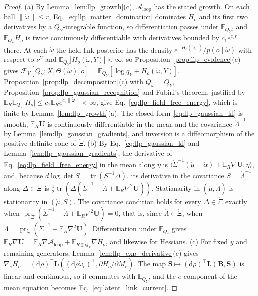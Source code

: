 \begin{proof}
(a) By Lemma~\ref{lem:llp_growth}(c), $\mathcal A_{\mathrm{loop}}$ has the stated growth. On each ball $\|\mathring\omega\|\leq r$, Eq.~\eqref{eq:llp_matter_domination} dominates $H_o$ and its first two derivatives by a $Q_Y$-integrable function, so differentiation passes under $\mathbb E_{Q_Y}$, and $\mathbb E_{Q_Y}H_o$ is twice continuously differentiable with derivatives bounded by $c_1e^{c_2r}$ there. At each $\mathring\omega$ the held-link posterior has the density $e^{-H_o(\mathring\omega,\cdot)}/p(o\mid\mathring\omega)$ with respect to $\nu^Y$ and $\mathbb E_{Q_Y}|H_o(\mathring\omega,Y)|<\infty$, so Proposition~\ref{prop:llp_evidence}(c) gives $\mathcal F_V[Q_Y;X,\Theta(\mathring\omega),o]=\mathbb E_{Q_Y}[\log q_Y+H_o(\mathring\omega,Y)]$. Proposition~\ref{prop:llp_decomposition}(c) with $Q_{\mathring\omega}=Q_Y$, Proposition~\ref{prop:llp_gaussian_recognition} and Fubini's theorem, justified by $\mathbb E_R\mathbb E_{Q_Y}|H_o|\leq c_1\mathbb E_Re^{c_2\|\mathring\omega\|}<\infty$, give Eq.~\eqref{eq:llp_field_free_energy}, which is finite by Lemma~\ref{lem:llp_growth}(a). The closed form~\eqref{eq:llp_gaussian_kl} is smooth, $\mathbb E_R\mathbf U$ is continuously differentiable in the mean and the covariance $\mathring\Lambda^{-1}$ by Lemma~\ref{lem:llp_gaussian_gradients}, and inversion is a diffeomorphism of the positive-definite cone of $\mathring\Xi$.
(b) By Eq.~\eqref{eq:llp_gaussian_kl} and Lemma~\ref{lem:llp_gaussian_gradients}, the derivative of Eq.~\eqref{eq:llp_field_free_energy} in the mean along $\eta$ is $\langle\mathring\Sigma^{-1}(\mathring\mu-\mathring\alpha)+\mathbb E_R\nabla\mathbf U,\eta\rangle$, and, because $d\log\det S=\operatorname{tr}(S^{-1}\Delta)$, its derivative in the covariance $S=\mathring\Lambda^{-1}$ along $\Delta\in\mathring\Xi$ is $\frac12\operatorname{tr}(\Delta(\mathring\Sigma^{-1}-\mathring\Lambda+\mathbb E_R\nabla^2\mathbf U))$. Stationarity in $(\mathring\mu,\mathring\Lambda)$ is stationarity in $(\mathring\mu,S)$. The covariance condition holds for every $\Delta\in\mathring\Xi$ exactly when $\operatorname{pr}_{\mathring\Xi}(\mathring\Sigma^{-1}-\mathring\Lambda+\mathbb E_R\nabla^2\mathbf U)=0$, that is, since $\mathring\Lambda\in\mathring\Xi$, when $\mathring\Lambda=\operatorname{pr}_{\mathring\Xi}(\mathring\Sigma^{-1}+\mathbb E_R\nabla^2\mathbf U)$. Differentiation under $\mathbb E_{Q_Y}$ gives $\mathbb E_R\nabla\mathbf U=\mathbb E_R\nabla\mathcal A_{\mathrm{loop}}+\mathbb E_{R\otimes Q_Y}\nabla H_o$, and likewise for Hessians.
(c) For fixed $y$ and remaining generators, Lemma~\ref{lem:llp_exp_derivative}(c) gives $\nabla_eH_o=(\mathrm d\rho)^\top\mathbf L((\mathrm d\rho\mathring\omega_e)^\top,\partial H_o/\partial M_e)$. The map $\mathbf S\mapsto(\mathrm d\rho)^\top\mathbf L(\mathbf B,\mathbf S)$ is linear and continuous, so it commutes with $\mathbb E_{Q_Y}$, and the $e$ component of the mean equation becomes Eq.~\eqref{eq:latent_link_current}.

\end{proof}
